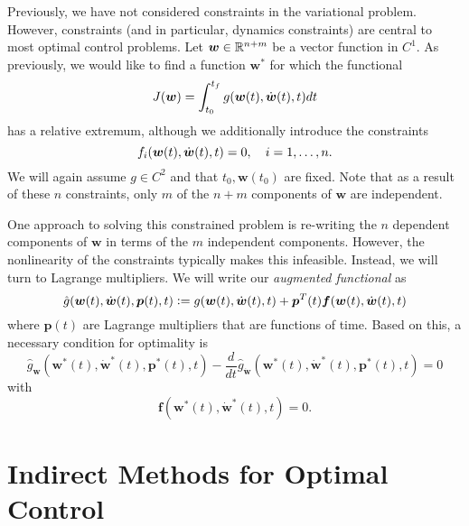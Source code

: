 Previously, we have not considered constraints in the variational problem. However, constraints (and in particular, dynamics constraints) are central to most optimal control problems. Let $\bm{w} \in \mathbb{R}^{n+m}$ be a vector function in $C^1$. As previously, we would like to find a function $\bm{w}^*$ for which the functional 
\begin{equation}
    J(\bm{w}) = \int_{t_0}^{t_f} g(\bm{w}(t),\dot{\bm{w}}(t),t) dt
\end{equation}
has a relative extremum, although we additionally introduce the constraints 
\begin{equation}
    f_i(\bm{w}(t), \dot{\bm{w}}(t),t) = 0, \quad i = 1, \ldots, n.
\end{equation}
We will again assume $g \in C^2$ and that $t_0, \bm{w}(t_0)$ are fixed. Note that as a result of these $n$ constraints, only $m$ of the $n+m$ components of $\bm{w}$ are independent. 

One approach to solving this constrained problem is re-writing the $n$ dependent components of $\bm{w}$ in terms of the $m$ independent components. However, the nonlinearity of the constraints typically makes this infeasible. Instead, we will turn to Lagrange multipliers. We will write our \textit{augmented functional} as 
\begin{equation}
    \hat{g}(\bm{w}(t),\dot{\bm{w}}(t),\bm{p}(t),t) \vcentcolon = g(\bm{w}(t),\dot{\bm{w}}(t),t) + \bm{p}^T(t) \bm{f}(\bm{w}(t),\dot{\bm{w}}(t),t)
\end{equation}
where $\bm{p}(t)$ are Lagrange multipliers that are functions of time. Based on this, a necessary condition for optimality is 
\begin{equation}
    \hat{g}_{\bm{w}}(\bm{w}^*(t),\dot{\bm{w}}^*(t),\bm{p}^*(t),t) - \frac{d}{dt} \hat{g}_{\dot{\bm{w}}}(\bm{w}^*(t),\dot{\bm{w}}^*(t),\bm{p}^*(t),t) = 0
\end{equation}
with 
\begin{equation}
    \bm{f}(\bm{w}^*(t), \dot{\bm{w}}^*(t),t) = 0.
\end{equation}


\section{Indirect Methods for Optimal Control}

